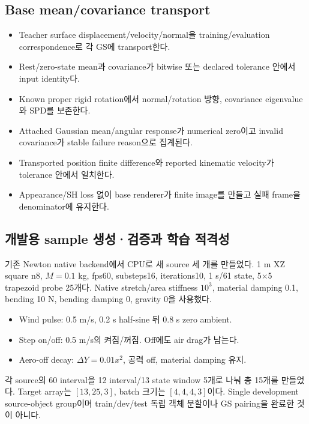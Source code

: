 \documentclass[10pt]{article}
\begin{document}
\subsection{Base mean/covariance transport}

\begin{itemize}
  \item[$\square$] Teacher surface displacement/velocity/normal을 training/evaluation correspondence로 각 GS에 transport한다.
  \item[$\square$] Rest/zero-state mean과 covariance가 bitwise 또는 declared tolerance 안에서 input identity다.
  \item[$\square$] Known proper rigid rotation에서 normal/rotation 방향, covariance eigenvalue와 SPD를 보존한다.
  \item[$\square$] Attached Gaussian mean/angular response가 numerical zero이고 invalid covariance가 stable failure reason으로 집계된다.
  \item[$\square$] Transported position finite difference와 reported kinematic velocity가 tolerance 안에서 일치한다.
  \item[$\square$] Appearance/SH loss 없이 base renderer가 finite image를 만들고 실패 frame을 denominator에 유지한다.
\end{itemize}

\subsection{개발용 sample 생성·검증과 학습 적격성}
\label{sec:r1-samples}

기존 Newton native backend에서 CPU로 새 source 세 개를 만들었다.
1 m XZ square n8, \(M=0.1\) kg, fps60, substeps16, iterations10, 1 s/61 state,
5$\times$5 trapezoid probe 25개다. Native stretch/area stiffness \(10^3\), material damping 0.1,
bending 10 N, bending damping 0, gravity 0을 사용했다.
\begin{itemize}
 \item Wind pulse: 0.5 m/s, 0.2 s half-sine 뒤 0.8 s zero ambient.
 \item Step on/off: 0.5 m/s의 켜짐/꺼짐. Off에도 air drag가 남는다.
 \item Aero-off decay: \(\Delta Y=0.01x^2\), 공력 off, material damping 유지.
\end{itemize}
각 source의 60 interval을 12 interval/13 state window 5개로 나눠 총 15개를 만들었다.
Target array는 \([13,25,3]\), batch 크기는 \([4,4,4,3]\)이다.
Single development source-object group이며 train/dev/test 독립 객체 분할이나 GS pairing을 완료한 것이 아니다.
\end{document}
